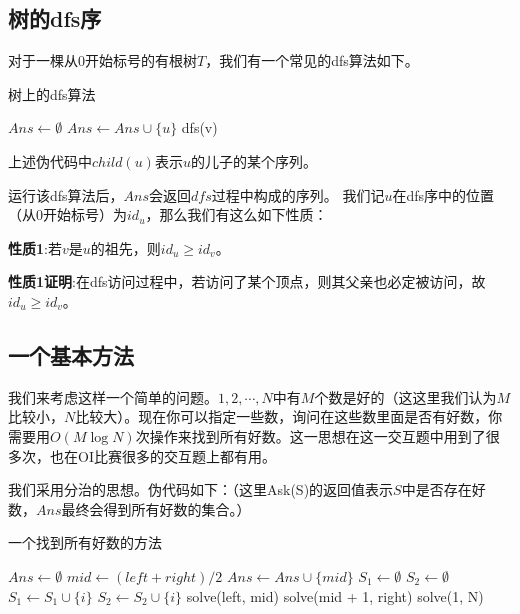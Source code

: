 \documentclass{noithesis}
\begin{document}
\subsection{树的dfs序}

对于一棵从$0$开始标号的有根树$T$，我们有一个常见的dfs算法如下。

\begin{algorithm}  
    \caption{树上的dfs算法} 
        \begin{algorithmic}[1]
        \State $Ans \gets \emptyset$
            \State $Ans \gets Ans \cup \{ u \}$
                    \State dfs(v)
            \EndFunction  
        \end{algorithmic}
\end{algorithm}

上述伪代码中$child(u)$表示$u$的儿子的某个序列。

运行该dfs算法后，$Ans$会返回$dfs$过程中构成的序列。
我们记$u$在dfs序中的位置（从$0$开始标号）为$id_u$，那么我们有这么如下性质：

\textbf{性质1}:若$v$是$u$的祖先，则$id_u \ge id_v$。

\textbf{性质1证明}:在dfs访问过程中，若访问了某个顶点，则其父亲也必定被访问，故$id_u \ge id_v$。



\subsection{一个基本方法}

我们来考虑这样一个简单的问题。$1, 2, \cdots, N$中有$M$个数是好的（这这里我们认为$M$比较小，$N$比较大）。现在你可以指定一些数，询问在这些数里面是否有好数，你需要用$O(M \log N)$次操作来找到所有好数。这一思想在这一交互题中用到了很多次，也在OI比赛很多的交互题上都有用。

我们采用分治的思想。伪代码如下：（这里Ask(S)的返回值表示$S$中是否存在好数，$Ans$最终会得到所有好数的集合。）

\newpage

\begin{algorithm}[h]
  \caption{一个找到所有好数的方法}
  \begin{algorithmic}
  \State $Ans \gets \emptyset$
    \State $mid \gets (left + right) / 2$
        \State $Ans \gets Ans \cup \{ mid \}$
    \Else
        \State $S_1 \gets \emptyset$
        \State $S_2 \gets \emptyset$
            \State $S_1 \gets S_1 \cup \{ i \}$
        \EndFor
            \State $S_2 \gets S_2 \cup \{ i \}$
        \EndFor
            \State solve(left, mid)
        \EndIf
            \State solve(mid + 1, right)
        \EndIf
    \EndIf
  \State solve(1, N)
  \end{algorithmic}
\end{algorithm}
\end{document}
